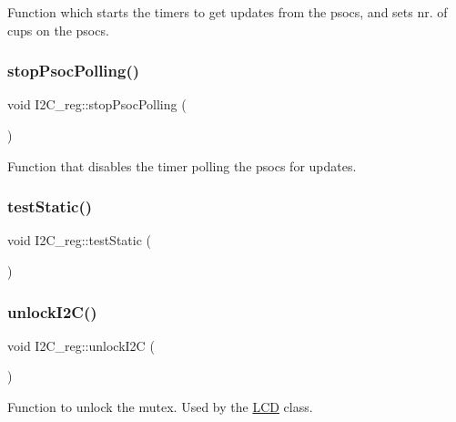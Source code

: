 Function which starts the timers to get updates from the psocs, and sets nr. of cups on the psocs. 

\mbox{\label{class_i2_c__reg_af5483b482bc8129b9d460a570789528b}} 
\subsubsection{\texorpdfstring{stop\+Psoc\+Polling()}{stopPsocPolling()}}
{\footnotesize\ttfamily void I2\+C\+\_\+reg\+::stop\+Psoc\+Polling (\begin{DoxyParamCaption}{ }\end{DoxyParamCaption})}



Function that disables the timer polling the psocs for updates. 

\mbox{\label{class_i2_c__reg_a3d471f20191b5918283fefca5d48e0e6}} 
\subsubsection{\texorpdfstring{test\+Static()}{testStatic()}}
{\footnotesize\ttfamily void I2\+C\+\_\+reg\+::test\+Static (\begin{DoxyParamCaption}{ }\end{DoxyParamCaption})}

\mbox{\label{class_i2_c__reg_a031bc853a788721fea14a98e9ab4c06c}} 
\subsubsection{\texorpdfstring{unlock\+I2\+C()}{unlockI2C()}}
{\footnotesize\ttfamily void I2\+C\+\_\+reg\+::unlock\+I2C (\begin{DoxyParamCaption}{ }\end{DoxyParamCaption})}



Function to unlock the mutex. Used by the \hyperlink{class_l_c_d}{L\+CD} class. 



